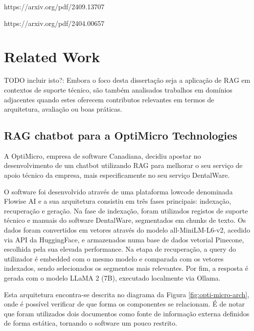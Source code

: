 https://arxiv.org/pdf/2409.13707

https://arxiv.org/pdf/2404.00657


\section{Related Work}

TODO incluir isto?: Embora o foco desta dissertação seja a aplicação de RAG em contextos de suporte técnico, são também analisados trabalhos em domínios adjacentes quando estes oferecem contributos relevantes em termos de arquitetura, avaliação ou boas práticas.

\subsection{RAG chatbot para a OptiMicro Technologies}

A OptiMicro, empresa de software Canadiana, decidiu apostar no desenvolvimento de um chatbot utilizando RAG para melhorar o seu serviço de apoio técnico da empresa, mais especificamente no seu serviço DentalWare.

O software foi desenvolvido através de uma plataforma lowcode denominada Flowise AI e a sua arquitetura consistiu em três fases principais: indexação, recuperação e geração. Na fase de indexação, foram utilizados registos de suporte técnico e manuais do software DentalWare, segmentados em chunks de texto. Os dados foram convertidos em vetores através do modelo all-MiniLM-L6-v2, acedido via API da HuggingFace, e armazenados numa base de dados vetorial Pinecone, escolhida pela sua elevada performance. Na etapa de recuperação, a query do utilizador é embedded com o mesmo modelo e comparada com os vetores indexados, sendo selecionados os segmentos mais relevantes. Por fim, a resposta é gerada com o modelo LLaMA 2 (7B), executado localmente via Ollama. 

Esta arquitetura encontra-se descrita no diagrama da Figura \ref{fig:opti-micro-arch}, onde é possível verificar de que forma os componentes se relacionam. É de notar que foram utilizados dois documentos como fonte de informação externa definidos de forma estática, tornando o software um pouco restrito.

